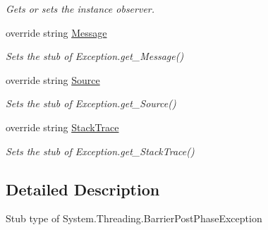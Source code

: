 \begin{DoxyCompactItemize}
\begin{DoxyCompactList}\small\item\em Gets or sets the instance observer.\end{DoxyCompactList}\item 
override string \hyperlink{class_system_1_1_threading_1_1_fakes_1_1_stub_barrier_post_phase_exception_a469ed91bc2b6f5f022e1e88843e03124}{Message}
\begin{DoxyCompactList}\small\item\em Sets the stub of Exception.\-get\-\_\-\-Message()\end{DoxyCompactList}\item 
override string \hyperlink{class_system_1_1_threading_1_1_fakes_1_1_stub_barrier_post_phase_exception_a9dfdd19bb60a25c3596f1d73de8a0b84}{Source}
\begin{DoxyCompactList}\small\item\em Sets the stub of Exception.\-get\-\_\-\-Source()\end{DoxyCompactList}\item 
override string \hyperlink{class_system_1_1_threading_1_1_fakes_1_1_stub_barrier_post_phase_exception_a34f3f82a035b310d26cfe8beb5d69fbf}{Stack\-Trace}
\begin{DoxyCompactList}\small\item\em Sets the stub of Exception.\-get\-\_\-\-Stack\-Trace()\end{DoxyCompactList}\end{DoxyCompactItemize}


\subsection{Detailed Description}
Stub type of System.\-Threading.\-Barrier\-Post\-Phase\-Exception



